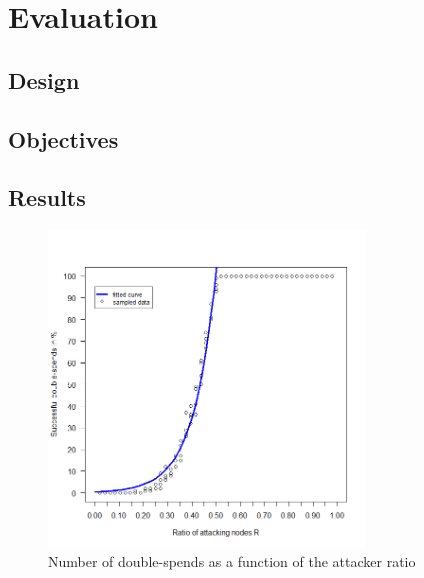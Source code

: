 \documentclass[a4paper,12pt,twoside]{report}
\begin{document}
\chapter{Evaluation}

\section{Design}
	
\section{Objectives}

\section{Results}
\begin{figure}[ht]
	\centering
  \includegraphics[width=0.75\textwidth]{Experiments/Ratio/ratio_f.png}
	\caption{Number of double-spends as a function of the attacker ratio}
	\label{network}
\end{figure}
\end{document}
